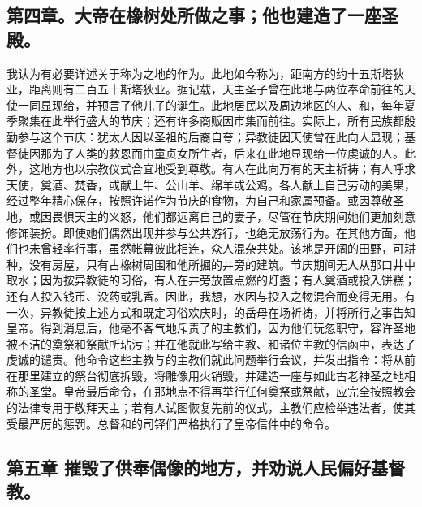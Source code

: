 
\subsection{第四章。大帝在橡树处所做之事；他也建造了一座圣殿。}

我认为有必要详述关于称为之地的作为。此地如今称为，距南方的约十五斯塔狄亚，距离则有二百五十斯塔狄亚。据记载，天主圣子曾在此地与两位奉命前往的天使一同显现给，并预言了他儿子的诞生。此地居民以及周边地区的人、和，每年夏季聚集在此举行盛大的节庆；还有许多商贩因市集而前往。实际上，所有民族都殷勤参与这个节庆：犹太人因以圣祖的后裔自夸；异教徒因天使曾在此向人显现；基督徒因那为了人类的救恩而由童贞女所生者，后来在此地显现给一位虔诚的人。此外，这地方也以宗教仪式合宜地受到尊敬。有人在此向万有的天主祈祷；有人呼求天使，奠酒、焚香，或献上牛、公山羊、绵羊或公鸡。各人献上自己劳动的美果，经过整年精心保存，按照许诺作为节庆的食物，为自己和家属预备。或因尊敬圣地，或因畏惧天主的义怒，他们都远离自己的妻子，尽管在节庆期间她们更加刻意修饰装扮。即使她们偶然出现并参与公共游行，也绝无放荡行为。在其他方面，他们也未曾轻率行事，虽然帐幕彼此相连，众人混杂共处。该地是开阔的田野，可耕种，没有房屋，只有古橡树周围和他所掘的井旁的建筑。节庆期间无人从那口井中取水；因为按异教徒的习俗，有人在井旁放置点燃的灯盏；有人奠酒或投入饼糕；还有人投入钱币、没药或乳香。因此，我想，水因与投入之物混合而变得无用。有一次，异教徒按上述方式和既定习俗欢庆时，的岳母在场祈祷，并将所行之事告知皇帝。得到消息后，他毫不客气地斥责了的主教们，因为他们玩忽职守，容许圣地被不洁的奠祭和祭献所玷污；并在他就此写给主教、和诸位主教的信函中，表达了虔诚的谴责。他命令这些主教与的主教们就此问题举行会议，并发出指令：将从前在那里建立的祭台彻底拆毁，将雕像用火销毁，并建造一座与如此古老神圣之地相称的圣堂。皇帝最后命令，在那地点不得再举行任何奠祭或祭献，应完全按照教会的法律专用于敬拜天主；若有人试图恢复先前的仪式，主教们应检举违法者，使其受最严厉的惩罚。总督和的司铎们严格执行了皇帝信件中的命令。\par


\subsection{第五章 摧毁了供奉偶像的地方，并劝说人民偏好基督教。}

